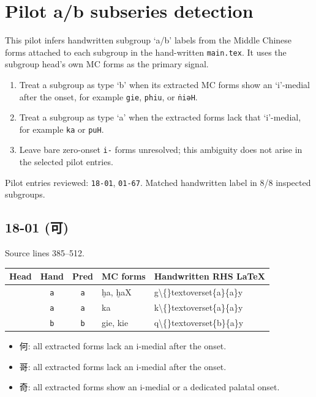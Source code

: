 \documentclass[11pt]{article}
\newcommand{\han}[1]{{\hanfont #1}}
\begin{document}
\section*{Pilot a/b subseries detection}
This pilot infers handwritten subgroup `a/b' labels from the Middle Chinese forms attached to each subgroup in the hand-written \texttt{main.tex}. It uses the subgroup head's own MC forms as the primary signal.
\begin{enumerate}[nosep]
\item Treat a subgroup as type `b' when its extracted MC forms show an `i'-medial after the onset, for example \texttt{gie}, \texttt{phiu}, or \texttt{ṅiəH}.
\item Treat a subgroup as type `a' when the extracted forms lack that `i'-medial, for example \texttt{ka} or \texttt{puH}.
\item Leave bare zero-onset \texttt{i-} forms unresolved; this ambiguity does not arise in the selected pilot entries.
\end{enumerate}
Pilot entries reviewed: \texttt{18-01}, \texttt{01-67}.
Matched handwritten label in 8/8 inspected subgroups.

\subsection*{18-01 (\han{可})}
Source lines 385--512.
{\small
\begin{tabularx}{\textwidth}{@{}>{\raggedright\arraybackslash}p{1.4cm}cc>{\raggedright\arraybackslash}X>{\raggedright\arraybackslash}X@{}}
\toprule
Head & Hand & Pred & MC forms & Handwritten RHS LaTeX \\
\midrule
\han{何} & \texttt{a} & \texttt{a} & ḫa, ḫaX & g\textbackslash\{\}textoverset\{a\}\{a\}y \\
\han{哥} & \texttt{a} & \texttt{a} & ka & k\textbackslash\{\}textoverset\{a\}\{a\}y \\
\han{奇} & \texttt{b} & \texttt{b} & gie, kie & q\textbackslash\{\}textoverset\{b\}\{a\}y \\
\bottomrule
\end{tabularx}
}
\begin{itemize}[nosep]
\item \han{何}: all extracted forms lack an i-medial after the onset.
\item \han{哥}: all extracted forms lack an i-medial after the onset.
\item \han{奇}: all extracted forms show an i-medial or a dedicated palatal onset.
\end{itemize}
\end{document}
